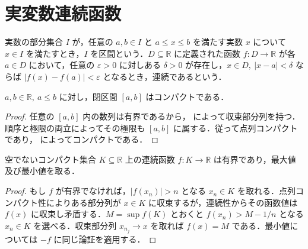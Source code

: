 \section{実変数連続函数}
\begin{defn}[実区間と実変数連続函数]
実数の部分集合 $I$ が，任意の $a,b\in I$ と $a\leq x\leq b$ を満たす実数 $x$ について $x\in I$ を満たすとき，$I$ を区間という．$D\subseteq\mathbb R$ に定義された函数 $f:D\to\mathbb R$ が各 $a\in D$ において，任意の $\varepsilon>0$ に対しある $\delta>0$ が存在し，$x\in D,\ |x-a|<\delta$ ならば $|f(x)-f(a)|<\varepsilon$ となるとき，連続であるという．
\end{defn}
\begin{prop}[閉有界区間のコンパクト性]
$a,b\in\mathbb R,\ a\leq b$ に対し，閉区間 $[a,b]$ はコンパクトである．
\end{prop}
\begin{proof}
任意の $[a,b]$ 内の数列は有界であるから， によって収束部分列を持つ．順序と極限の両立によってその極限も $[a,b]$ に属する．従って点列コンパクトであり， によってコンパクトである．
\end{proof}
\begin{prop}
空でないコンパクト集合 $K\subseteq\mathbb R$ 上の連続函数 $f:K\to\mathbb R$ は有界であり，最大値及び最小値を取る．
\end{prop}
\begin{proof}
もし $f$ が有界でなければ，$|f(x_n)|>n$ となる $x_n\in K$ を取れる．点列コンパクト性によりある部分列が $x\in K$ に収束するが，連続性からその函数値は $f(x)$ に収束し矛盾する．$M=\sup f(K)$ とおくと $f(x_n)>M-1/n$ となる $x_n\in K$ を選べる．収束部分列 $x_{n_j}\to x$ を取れば $f(x)=M$ である．最小値については $-f$ に同じ論証を適用する．
\end{proof}
